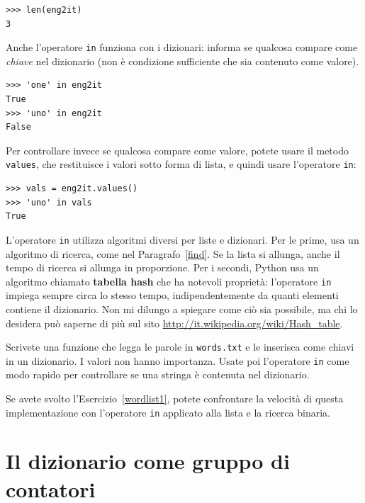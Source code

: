\documentclass[10pt]{book}
\begin{document}
\begin{verbatim}
>>> len(eng2it)
3
\end{verbatim}
%
Anche l'operatore {\tt in} funziona con i dizionari: informa se qualcosa compare come {\em chiave} nel dizionario (non è condizione sufficiente che sia contenuto come valore).

\begin{verbatim}
>>> 'one' in eng2it
True
>>> 'uno' in eng2it
False
\end{verbatim}
%
Per controllare invece se qualcosa compare come valore, potete usare il metodo {\tt values}, che restituisce i valori sotto forma di lista, e quindi usare l'operatore {\tt in}:

\begin{verbatim}
>>> vals = eng2it.values()
>>> 'uno' in vals
True
\end{verbatim}
%
L'operatore {\tt in} utilizza algoritmi diversi per liste e dizionari. Per le prime, usa un algoritmo di ricerca, come nel Paragrafo~\ref{find}.  Se la lista si allunga, anche il tempo di ricerca si allunga in proporzione. Per i secondi, Python usa un algoritmo chiamato {\bf tabella hash} che ha notevoli proprietà: l'operatore {\tt in} impiega sempre circa lo stesso tempo, indipendentemente da quanti elementi contiene il dizionario. Non mi dilungo a spiegare come ciò sia possibile, ma chi lo desidera può saperne di più sul sito
\url{http://it.wikipedia.org/wiki/Hash_table}.

\vspace{0.2in}
\begin{exercise}
\label{wordlist2}

Scrivete una funzione che legga le parole in {\tt words.txt} e le inserisca come chiavi in un dizionario. I valori non hanno importanza. Usate poi l'operatore {\tt in} come modo rapido per controllare se una stringa è contenuta nel dizionario.

Se avete svolto l'Esercizio~\ref{wordlist1}, potete confrontare la velocità di questa implementazione con l'operatore {\tt in} applicato alla lista e la ricerca binaria.

\end{exercise}


\section{Il dizionario come gruppo di contatori}
\label{histogram}
\end{document}
